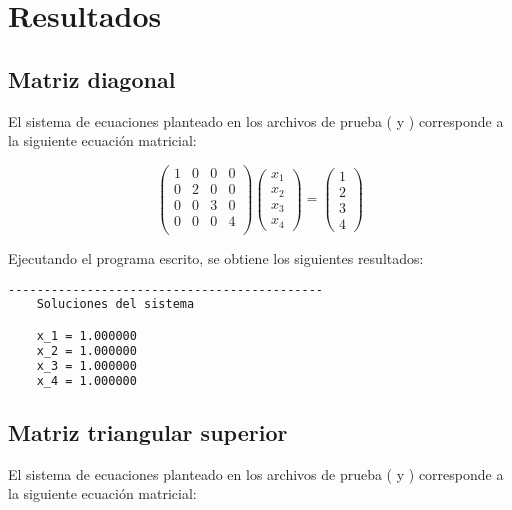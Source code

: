 \section{Resultados}

\subsection{Matriz diagonal}

El sistema de ecuaciones planteado en los archivos de prueba ( y ) corresponde a la siguiente ecuación matricial:

\begin{equation*}
    \begin{pmatrix}
        1 & 0 & 0 & 0 \\
        0 & 2 & 0 & 0 \\
        0 & 0 & 3 & 0 \\
        0 & 0 & 0 & 4 \\
    \end{pmatrix}
    \begin{pmatrix}
        x_1 \\
        x_2 \\
        x_3 \\
        x_4
    \end{pmatrix} = \begin{pmatrix}
        1 \\
        2 \\
        3 \\
        4
    \end{pmatrix}
\end{equation*}

Ejecutando el programa escrito, se obtiene los siguientes resultados:

\begin{lstlisting}[language=bash]
    --------------------------------------------
    Soluciones del sistema

    x_1	= 1.000000
    x_2	= 1.000000
    x_3	= 1.000000
    x_4	= 1.000000

\end{lstlisting}

\subsection{Matriz triangular superior}

El sistema de ecuaciones planteado en los archivos de prueba ( y ) corresponde a la siguiente ecuación matricial:


